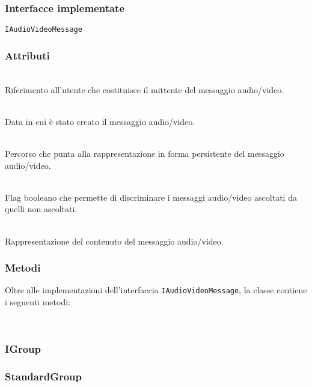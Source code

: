 \subsubsection*{Interfacce implementate}
\texttt{IAudioVideoMessage}

\subsubsection*{Attributi}
\begin{description}
  \item{}\\
Riferimento all'utente che costituisce il mittente del messaggio audio/video.
  \item{}\\
Data in cui è stato creato il messaggio audio/video.
  \item{}\\
Percorso che punta alla rappresentazione in forma persistente del messaggio audio/video.
  \item{}\\
Flag booleano che permette di discriminare i messaggi audio/video ascoltati da quelli non ascoltati.
  \item{}\\
Rappresentazione del contenuto del messaggio audio/video.
\end{description}

\subsubsection*{Metodi}
Oltre alle implementazioni dell'interfaccia \texttt{IAudioVideoMessage}, la classe contiene i seguenti metodi:
\begin{description}
  \item{}\\
\end{description}

\subsubsection{IGroup}\label{sec:igroup}

\subsubsection{StandardGroup}\label{sec:standardgroup}

